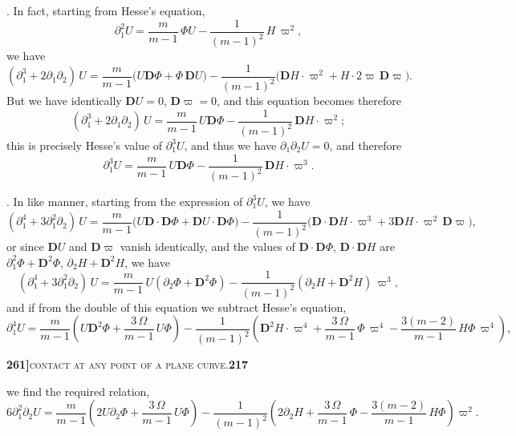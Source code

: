 \documentclass[11pt]{article}
\begin{document}
\medskip

. In fact, starting from Hesse's equation,
\[
\partial_1^2 U = \frac{m}{m-1}\,\Phi U - \frac{1}{(m-1)^2}\,H\,\varpi^2,
\]
we have
\[
(\partial_1^3 + 2\partial_1\partial_2)\,U
   = \frac{m}{m-1}\bigl(U\mathbf{D}\Phi + \Phi\,\mathbf{D}U\bigr)
   - \frac{1}{(m-1)^2}\bigl(\mathbf{D}H \cdot \varpi^2 + H \cdot 2\varpi\,\mathbf{D}\varpi\bigr).
\]
But we have identically $\mathbf{D}U = 0$, $\mathbf{D}\varpi = 0$, and this equation becomes therefore
\[
(\partial_1^3 + 2\partial_1\partial_2)\,U = \frac{m}{m-1}\,U\mathbf{D}\Phi - \frac{1}{(m-1)^2}\,\mathbf{D}H \cdot \varpi^2;
\]
this is precisely Hesse's value of $\partial_1^3 U$, and thus we have $\partial_1\partial_2 U = 0$, and therefore
\[
\partial_1^3 U = \frac{m}{m-1}\,U\mathbf{D}\Phi - \frac{1}{(m-1)^2}\,\mathbf{D}H \cdot \varpi^3.
\]

\medskip

. In like manner, starting from the expression of $\partial_1^3 U$, we have
\[
(\partial_1^4 + 3\partial_1^2\partial_2)\,U
   = \frac{m}{m-1}\bigl(U\mathbf{D} \cdot \mathbf{D}\Phi + \mathbf{D}U \cdot \mathbf{D}\Phi\bigr)
   - \frac{1}{(m-1)^2}\bigl(\mathbf{D} \cdot \mathbf{D}H \cdot \varpi^3 + 3\mathbf{D}H \cdot \varpi^2\,\mathbf{D}\varpi\bigr),
\]
or since $\mathbf{D}U$ and $\mathbf{D}\varpi$ vanish identically, and the values of $\mathbf{D} \cdot \mathbf{D}\Phi$, $\mathbf{D} \cdot \mathbf{D}H$ are $\partial_1^2 \Phi + \mathbf{D}^2\Phi$, $\partial_2 H + \mathbf{D}^2 H$, we have
\[
(\partial_1^4 + 3\partial_1^2\partial_2)\,U
   = \frac{m}{m-1}\,U(\partial_2\Phi + \mathbf{D}^2\Phi) - \frac{1}{(m-1)^2}(\partial_2 H + \mathbf{D}^2 H)\,\varpi^3,
\]
and if from the double of this equation we subtract Hesse's equation,
\[
\partial_1^4 U = \frac{m}{m-1}\!\left(U\mathbf{D}^2\Phi + \frac{3\,\Omega}{m-1}\,U\Phi\right)
   - \frac{1}{(m-1)^2}\!\left(\mathbf{D}^2 H \cdot \varpi^4 + \frac{3\,\Omega}{m-1}\,\Phi\,\varpi^4 - \frac{3(m-2)}{m-1}\,H\Phi\,\varpi^4\right),
\]

\newpage

\noindent\textbf{261]}\hfill\textsc{contact at any point of a plane curve.}\hfill\textbf{217}

\medskip

\noindent we find the required relation,
\[
6\partial_1^2\partial_2 U
   = \frac{m}{m-1}\!\left(2U\partial_2\Phi + \frac{3\,\Omega}{m-1}\,U\Phi\right)
   - \frac{1}{(m-1)^2}\!\left(2\partial_2 H + \frac{3\,\Omega}{m-1}\,\Phi - \frac{3(m-2)}{m-1}\,H\Phi\right)\!\varpi^2.
\]
\end{document}
